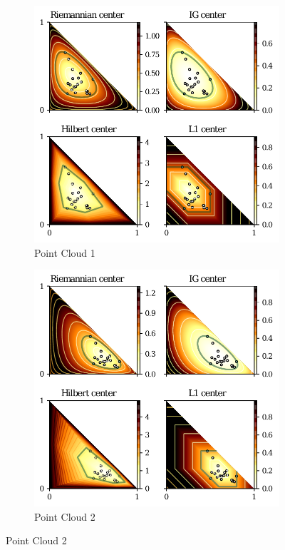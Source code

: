 \documentclass[graybox]{svmult}
\begin{document}
\begin{figure}[!htb]
\centering
\begin{subfigure}[m]{.7\textwidth}
\includegraphics[width=\textwidth]{center1}%
\caption{Point Cloud 1}
\end{subfigure}
\begin{subfigure}[m]{.7\textwidth}
\includegraphics[width=\textwidth]{center2}%
\caption{Point Cloud 2}
\end{subfigure}
\end{figure}
\end{document}
